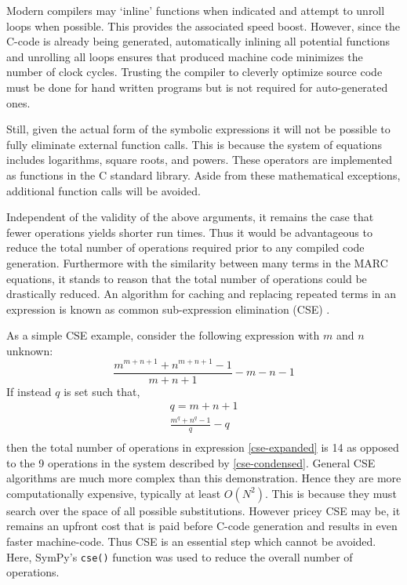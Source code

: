 \documentclass[preprint,12pt]{elsarticle}
\begin{document}
Modern compilers may `inline' functions when indicated and attempt 
to unroll loops when possible. This provides the associated speed boost.  However, 
since the C-code is already being generated, automatically inlining all potential
functions and unrolling all loops ensures that produced machine code 
minimizes the number of clock cycles.  Trusting the compiler to cleverly optimize
source code must be done for hand written programs but is not required 
for auto-generated ones.

Still, given the actual form of the symbolic expressions it will not be possible to 
fully 
eliminate external function calls.  This is because the system of equations includes 
logarithms, square roots, and powers.  These operators are implemented as functions 
in the C standard library.
Aside from these mathematical exceptions, additional function calls will
be avoided.

Independent of the validity of the above arguments, it remains the case that fewer 
operations yields
shorter run times.  Thus it would be advantageous to reduce the total number of 
operations required prior to any compiled code generation.  Furthermore with the
similarity between many terms in the MARC equations, it stands to reason that the
total number of operations could be drastically reduced.  An algorithm for 
caching and replacing repeated terms in an expression is known as common 
sub-expression elimination (CSE) \cite{Cocke:1970:GCS:390013.808480}.

As a simple CSE example, consider the following expression with $m$ and $n$ unknown:
\begin{equation}
\frac{m^{m+n+1} + n^{m+n+1} - 1}{m + n + 1} - m - n - 1
\label{cse-expanded}
\end{equation}
If instead $q$ is set such that,
\begin{equation}
\begin{array}{l}
q = m + n + 1\\
\frac{m^{q} + n^{q} - 1}{q} - q\\
\end{array}
\label{cse-condensed}
\end{equation}
then the total number of operations in expression \ref{cse-expanded} is 14 as
opposed to the 9 operations in the system described by \ref{cse-condensed}.
General CSE algorithms are much more complex than this demonstration.  Hence they are
more computationally expensive, typically at least $O(N^2)$.  This is because
they must search over the space of all possible substitutions.  However pricey
CSE may be, it remains an upfront cost that is paid before C-code generation and
results in even faster machine-code.  Thus CSE is an essential step which cannot be 
avoided.  Here, SymPy's \texttt{cse()} function was used to reduce the overall 
number of operations.
\end{document}
